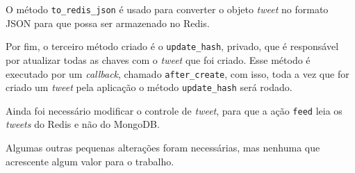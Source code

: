 O método \verb|to_redis_json| é usado para converter o objeto \textit{tweet} no formato JSON para que possa ser armazenado no \ac{Redis}.

Por fim, o terceiro método criado é o \verb|update_hash|, privado, que é responsável por atualizar todas as chaves com o \textit{tweet} que foi criado. Esse método é executado por um \textit{callback}, chamado \verb|after_create|, com isso, toda a vez que for criado um \textit{tweet} pela aplicação o método \verb|update_hash| será rodado.

Ainda foi necessário modificar o controle de \textit{tweet}, para que a ação \verb|feed| leia os \textit{tweets} do \ac{Redis} e não do MongoDB.

Algumas outras pequenas alterações foram necessárias, mas nenhuma que acrescente algum valor para o trabalho.









